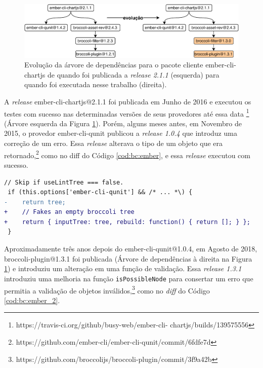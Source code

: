 \begin{figure}
    \centering
    \includegraphics[scale=0.9]{figuras/bc_example_full.pdf}
    \caption{Evolução da árvore de dependências para o pacote cliente \textsf{ember-cli-chartjs} de quando foi publicada a \textit{release 2.1.1} (esquerda) para quando foi executada nesse trabalho (direita).}
    \label{fig:dependency_tree}
\end{figure}

A \textit{release} \textsf{ember-cli-chartjs@2.1.1} foi publicada em Junho de 2016 e executou os testes com sucesso nas determinadas versões de seus provedores até essa data \footnote{https://travis-ci.org/github/busy-web/ember-cli-
chartjs/builds/139575556} (Árvore esquerda da Figura \ref{fig:dependency_tree}). Porém, alguns meses antes, em Novembro de 2015, o provedor \textsf{ember-cli-qunit} publicou a \textit{release 1.0.4} que introduz uma correção de um erro. Essa \textit{release} alterava o tipo de um objeto que era retornado,\footnote{https://github.com/ember-cli/ember-cli-qunit/commit/6fdfe7d} como no diff do Código \ref{cod:bc:ember}, e essa \textit{release} executou com sucesso.

\begin{lstlisting}[numbers=none, language=diff, label=cod:bc:ember, caption={Alteração no tipo do objeto retornado em \textsf{ember-cli-qunit@1.0.4}.}]
 // Skip if useLintTree === false.
 if (this.options['ember-cli-qunit'] && /* ... *\) {
-    return tree;
+    // Fakes an empty broccoli tree
+    return { inputTree: tree, rebuild: function() { return []; } };
 }
\end{lstlisting}

Aproximadamente três anos depois do \textsf{ember-cli-qunit@1.0.4}, em Agosto de 2018, \textsf{broccoli-plugin@1.3.1} foi publicada (Árvore de dependências à direita na Figura \ref{fig:dependency_tree}) e introduziu um alteração em uma função de validação. Essa \textit{release 1.3.1} introduziu uma melhoria na função \texttt{isPossibleNode} para consertar um erro que permitia a validação de objetos inválidos,\footnote{https://github.com/broccolijs/broccoli-plugin/commit/3f9a42b} como no \textit{diff} do Código \ref{cod:bc:ember_2}.

